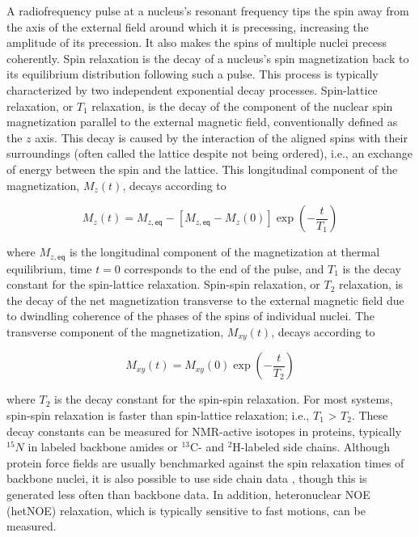 \documentclass[9pt,review,pubversion]{livecoms}
\begin{document}
A radiofrequency pulse at a nucleus’s resonant frequency tips the spin away from the axis of the external field around which it is precessing, increasing the amplitude of its precession.
It also makes the spins of multiple nuclei precess coherently.
Spin relaxation is the decay of a nucleus’s spin magnetization back to its equilibrium distribution following such a pulse.
This process is typically characterized by two independent exponential decay processes.
Spin-lattice relaxation, or $T_1$ relaxation, is the decay of the component of the nuclear spin magnetization parallel to the external magnetic field, conventionally defined as the $z$ axis.
This decay is caused by the interaction of the aligned spins with their surroundings (often called the lattice despite not being ordered), i.e., an exchange of energy between the spin and the lattice.
This longitudinal component of the magnetization, $M_z(t)$, decays according to

\begin{equation}
\label{eqn:t1_relax}
M_z(t) = M_{z,\mathsf{eq}} - [M_{z,\mathsf{eq}} - M_z(0)] \exp \left( -\frac {t} {T_1} \right)
\end{equation}

\noindent where $M_{z,\mathsf{eq}}$ is the longitudinal component of the magnetization at thermal equilibrium, time $t = 0$ corresponds to the end of the pulse, and $T_1$ is the decay constant for the spin-lattice relaxation.
Spin-spin relaxation, or $T_2$ relaxation, is the decay of the net magnetization transverse to the external magnetic field due to dwindling coherence of the phases of the spins of individual nuclei. The transverse component of the magnetization, $M_{xy}(t)$, decays according to

\begin{equation}
\label{eqn:t2_relax}
M_{xy}(t) = M_{xy}(0) \exp \left( -\frac {t} {T_2} \right)
\end{equation}

\noindent where $T_2$ is the decay constant for the spin-spin relaxation.
For most systems, spin-spin relaxation is faster than spin-lattice relaxation; i.e., $T_1$ > $T_2$.
These decay constants can be measured for NMR-active isotopes in proteins, typically $^{15}N$ in labeled backbone amides or $^{13}$C- and $^2$H-labeled side chains.
Although protein force fields are usually benchmarked against the spin relaxation times of backbone nuclei, it is also possible to use side chain data \cite{hoffmann_accurate_2018}, though this is generated less often than backbone data.
In addition, heteronuclear NOE (hetNOE) relaxation, which is typically sensitive to fast motions, can be measured.
\end{document}

